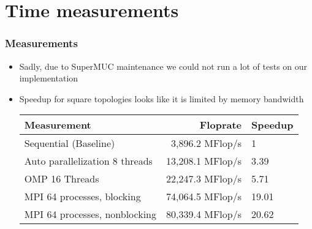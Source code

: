 \section{Time measurements}
\begin{frame}
  \frametitle{Measurements}
  \begin{itemize}
  \item Sadly, due to SuperMUC maintenance we could not run a lot of tests on our implementation
    \item Speedup for square topologies looks like it is limited by memory bandwidth
    \begin{center}
      \begin{tabular} {|l|r|l|}
        \hline
        Measurement & Floprate & Speedup \\ \hline
        Sequential (Baseline) & 3,896.2 MFlop/s & 1 \\ \hline
        Auto parallelization 8 threads & 13,208.1 MFlop/s & 3.39 \\ \hline
        OMP 16 Threads  & 22,247.3 MFlop/s & 5.71\\ \hline
        MPI 64 processes, blocking  & 74,064.5 MFlop/s & 19.01\\ \hline
        MPI 64 processes, nonblocking  & 80,339.4 MFlop/s & 20.62\\ \hline
      \end{tabular}
    \end{center}
  \end{itemize}
\end{frame}
